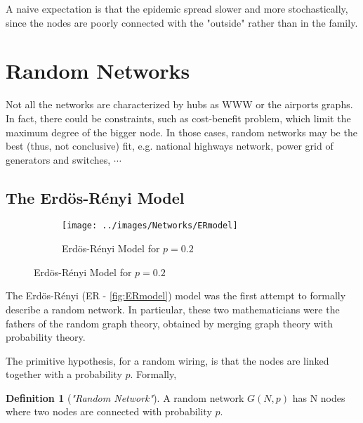 \documentclass[a4paper,10pt,twoside]{book} %
\theoremstyle{definition}
\newtheorem{definition}{Definition}[section]
\begin{document}
A naive expectation is that the epidemic spread slower and more stochastically, since the nodes are poorly connected with the "outside" rather than in the family.

\section{Random Networks}
Not all the networks are characterized by hubs as WWW or the airports graphs.
In fact, there could be constraints, such as cost-benefit problem, which limit the maximum degree of the bigger node. In those cases, random networks may be the best (thus, not conclusive) fit, e.g. national highways network, power grid of generators and switches, $\cdots$

\subsection{The Erdös-Rényi Model}
\label{sec:ER_model}

\begin{figure}[ht]
    \begin{subfigure}{\textwidth}
        \texttt{[image: ../images/Networks/ERmodel]}
        \centering
        \caption{Erdös-Rényi Model for $p = 0.2$ \cite{Baronchelli:2017_EpidSpreadCompNets}}
        \label{fig:ERmodel}
    \end{subfigure}
\end{figure}

The Erdös-Rényi (ER - \autoref{fig:ERmodel}) model was the first attempt to formally describe a random network. 
In particular, these two mathematicians were the fathers of the random graph theory, obtained by merging graph theory with probability theory.

The primitive hypothesis, for a random wiring, is that the nodes are linked together with a probability $p$. Formally,

\begin{definition}[\textit{"Random Network"}]
A random network $G(N,p)$ has N nodes where two nodes are connected with probability $p$.
\end{definition} 
\end{document}
